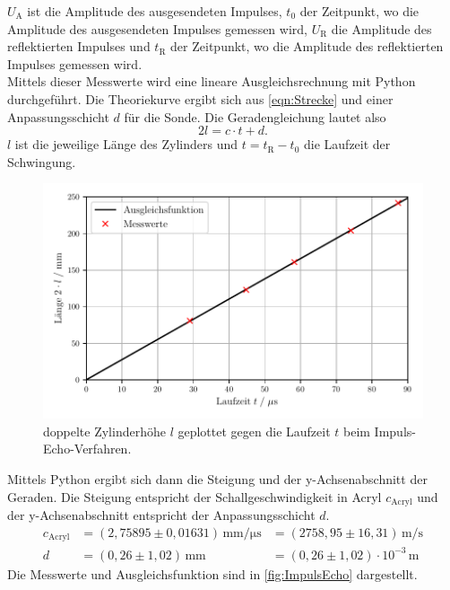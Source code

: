   $U_{\mathrm{A}}$ ist die Amplitude des ausgesendeten Impulses, $t_0$ der Zeitpunkt, wo die Amplitude des ausgesendeten Impulses
  gemessen wird, $U_{\mathrm{R}}$ die Amplitude des reflektierten Impulses und $t_{\mathrm{R}}$ der Zeitpunkt, wo die Amplitude des reflektierten
  Impulses gemessen wird.\\
  Mittels dieser Messwerte wird eine lineare Ausgleichsrechnung mit Python durchgeführt. Die Theoriekurve ergibt sich aus
  \autoref{eqn:Strecke} und einer Anpassungsschicht $d$ für die Sonde. Die Geradengleichung lautet also
  \begin{equation*}
    2l = c \cdot t + d.
  \end{equation*}
  $l$ ist die jeweilige Länge des Zylinders und $t = t_{\mathrm{R}} - t_0$ die Laufzeit der Schwingung.\\
  \begin{figure}
    \centering
    \includegraphics[width=15cm]{messwerte/ImpulsEcho.pdf}
    \caption{doppelte Zylinderhöhe $l$ geplottet gegen die Laufzeit $t$ beim Impuls-Echo-Verfahren.}
    \label{fig:ImpulsEcho}
  \end{figure}
  Mittels Python ergibt sich dann die Steigung und der y-Achsenabschnitt der Geraden. Die Steigung entspricht
  der Schallgeschwindigkeit in Acryl $c_{\mathrm{Acryl}}$ und der y-Achsenabschnitt entspricht der Anpassungsschicht $d$.\\
  \begin{align*}
    c_{\mathrm{Acryl}} &= (2,75895 \pm 0,01631) \, \si{\milli\meter\per\micro\second} &= (2758,95 \pm 16,31) \, \si{\meter\per\second} \\
    d &= (0,26 \pm 1,02) \, \si{\milli\meter} &= (0,26 \pm 1,02) \cdot 10^{-3} \, \si{\meter}
  \end{align*}
  Die Messwerte und Ausgleichsfunktion sind in \autoref{fig:ImpulsEcho} dargestellt.

